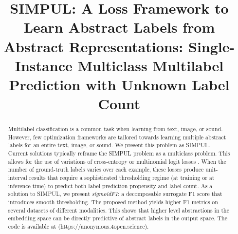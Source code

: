 \documentclass[sigconf,natbib,screen=true,review=true,anonymous]{acmart}
\begin{document}
\title{SIMPUL: A Loss Framework to Learn Abstract Labels from Abstract Representations: Single-Instance Multiclass Multilabel Prediction with Unknown Label Count}

\begin{abstract}
Multilabel classification is a common task when learning from text, image, or sound. However, few optimization frameworks are tailored towards learning multiple abstract labels for an entire text, image, or sound. We present this problem as SIMPUL.  Current solutions typically reframe the SIMPUL problem as a multiclass problem. This allows for the use of variations of cross-entropy or multinomial logit losses . When the number of ground-truth labels varies over each example, these losses produce unit-interval results that require a sophisticated thresholding regime (at training or at inference time) to predict both label prediction propensity and label count. As a solution to SIMPUL, we present \emph{sigmoidF1}: a decomposable surrogate F1 score that introduces smooth thresholding. The proposed method yields higher F1 metrics on several datasets of different modalities. This shows that higher level abstractions in the embedding space can be directly predictive of abstract labels in the output space. The code is available at (https://anonymous.4open.science).



\end{abstract}



\maketitle
\end{document}
